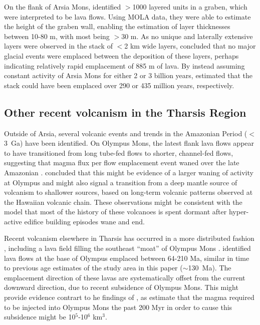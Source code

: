 On the flank of Arsia Mons, \citet{mouginis2008lava} identified $>$1000 layered units in a graben, which were interpreted to be lava flows. Using MOLA data, they were able to estimate the height of the graben wall, enabling the estimation of layer thicknesses between 10-80 m, with most being $>$30 m. As no unique and laterally extensive layers were observed in the stack of $<$2 km wide layers, \citet{mouginis2008lava} concluded that no major glacial events were emplaced between the deposition of these layers, perhaps indicating relatively rapid emplacement of 885 m of lava. By instead assuming constant activity of Arsia Mons for either 2 or 3 billion years, \citet{mouginis2008lava} estimated that the stack could have been emplaced over 290 or 435 million years, respectively. 

\subsection{Other recent volcanism in the Tharsis Region}

Outside of Arsia, several volcanic events and trends in the Amazonian Period ($<$3~Ga) have been identified. On Olympus Mons, the latest flank lava flows appear to have transitioned from long tube-fed flows to shorter, channel-fed flows, suggesting that magma flux per flow emplacement event waned over the late Amazonian \citep{bleacher2007olympus}. \citet{bleacher2007olympus} concluded that this might be evidence of a larger waning of activity at Olympus and might also signal a transition from a deep mantle source of volcanism to shallower sources, based on long-term volcanic patterns observed at the Hawaiian volcanic chain. These observations might be consistent with the \citet{wilson2001evidence} model that most of the history of these volcanoes is spent dormant after hyper-active edifice building episodes wane and end.

Recent volcanism elsewhere in Tharsis has occurred in a more distributed fashion \citep{hauber2011very}, including a lava field filling the southeast ``moat'' of Olympus Mons \citep{chadwick2015late}. \citet{chadwick2015late} identified lava flows at the base of Olympus emplaced between 64-210 Ma, similar in time to previous age estimates of the study area in this paper ($\sim$130~Ma). The emplacement direction of these lavas are systematically offset from the current downward direction, due to recent subsidence of Olympus Mons. This might provide evidence contrart to he findings of \citet{bleacher2007olympus}, as \citet{chadwick2015late} estimate that the magma required to be injected into Olympus Mons the past 200 Myr in order to cause this subsidence might be 10$^5$-10$^6$ km$^3$.

